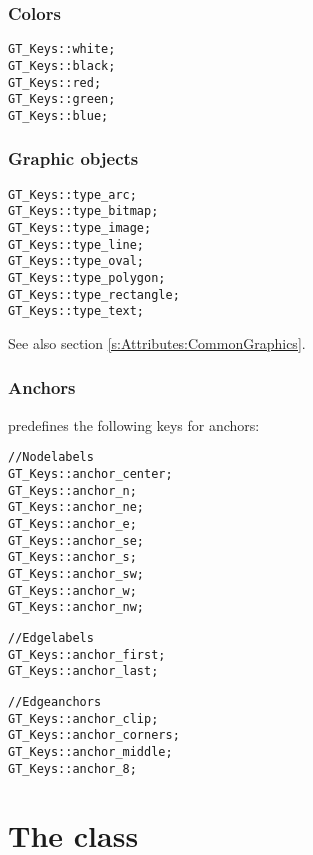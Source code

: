 \documentclass[twoside,fleqn]{report}
\begin{document}
%
%

\subsubsection{Colors}

\begin{alltt}
GT_Keys::white;
GT_Keys::black;
GT_Keys::red;
GT_Keys::green;
GT_Keys::blue;
\end{alltt}

%
%

\subsubsection{Graphic objects}

\begin{alltt}
GT_Keys::type_arc;
GT_Keys::type_bitmap;
GT_Keys::type_image;
GT_Keys::type_line;
GT_Keys::type_oval;
GT_Keys::type_polygon;
GT_Keys::type_rectangle;
GT_Keys::type_text;
\end{alltt}

\noindent See also section \ref{s:Attributes:CommonGraphics}.

\subsubsection{Anchors}

\Graphlet{} predefines the following keys for anchors:

\begin{alltt}
// Node labels
GT_Keys::anchor_center;
GT_Keys::anchor_n;
GT_Keys::anchor_ne;
GT_Keys::anchor_e;
GT_Keys::anchor_se;
GT_Keys::anchor_s;
GT_Keys::anchor_sw;
GT_Keys::anchor_w;
GT_Keys::anchor_nw;
\end{alltt}

\begin{alltt}
// Edge labels
GT_Keys::anchor_first;
GT_Keys::anchor_last;
\end{alltt}

\begin{alltt}
// Edge anchors
GT_Keys::anchor_clip;
GT_Keys::anchor_corners;
GT_Keys::anchor_middle;
GT_Keys::anchor_8;
\end{alltt}



%
%

\section{The class }
\end{document}
